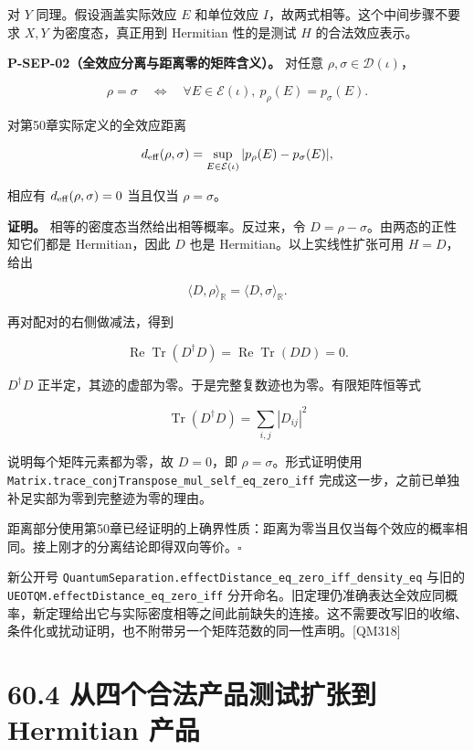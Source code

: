 \documentclass[
  11pt,
  oneside]{book}
\begin{document}
对 \(Y\) 同理。假设涵盖实际效应 \(E\) 和单位效应
\(I\)，故两式相等。这个中间步骤不要求 \(X,Y\) 为密度态，真正用到
Hermitian 性的是测试 \(H\) 的合法效应表示。

\protect\hypertarget{p-sep-02}{}{}

\textbf{P-SEP-02（全效应分离与距离零的矩阵含义）。} 对任意
\(\rho,\sigma\in\mathcal D(\iota)\)，

\[
\rho=\sigma
\quad\Longleftrightarrow\quad
\forall E\in\mathcal E(\iota),\ p_\rho(E)=p_\sigma(E).
\]

对第50章实际定义的全效应距离

\[
d_{\rm eff}(\rho,\sigma)
=\sup_{E\in\mathcal E(\iota)}
|p_\rho(E)-p_\sigma(E)|,
\]

相应有 \(d_{\rm eff}(\rho,\sigma)=0\) 当且仅当 \(\rho=\sigma\)。

\textbf{证明。} 相等的密度态当然给出相等概率。反过来，令
\(D=\rho-\sigma\)。由两态的正性知它们都是 Hermitian，因此 \(D\) 也是
Hermitian。以上实线性扩张可用 \(H=D\)，给出

\[
\langle D,\rho\rangle_{\mathbb R}
=\langle D,\sigma\rangle_{\mathbb R}.
\]

再对配对的右侧做减法，得到

\[
\operatorname{Re}\operatorname{Tr}(D^\dagger D)
=\operatorname{Re}\operatorname{Tr}(DD)=0.
\]

\(D^\dagger D\)
正半定，其迹的虚部为零。于是完整复数迹也为零。有限矩阵恒等式

\[
\operatorname{Tr}(D^\dagger D)
=\sum_{i,j}|D_{ij}|^2
\]

说明每个矩阵元素都为零，故 \(D=0\)，即 \(\rho=\sigma\)。形式证明使用
\texttt{Matrix.trace\_\allowbreak conjTranspose\_\allowbreak mul\_\allowbreak self\_\allowbreak eq\_\allowbreak zero\_\allowbreak iff}
完成这一步，之前已单独补足实部为零到完整迹为零的理由。

距离部分使用第50章已经证明的上确界性质：距离为零当且仅当每个效应的概率相同。接上刚才的分离结论即得双向等价。\(\square\)

新公开号
\texttt{QuantumSeparation.effectDistance\_\allowbreak eq\_\allowbreak zero\_\allowbreak iff\_\allowbreak density\_\allowbreak eq}
与旧的 \texttt{UEOTQM.effectDistance\_\allowbreak eq\_\allowbreak zero\_\allowbreak iff}
分开命名。旧定理仍准确表达全效应同概率，新定理给出它与实际密度相等之间此前缺失的连接。这不需要改写旧的收缩、条件化或扰动证明，也不附带另一个矩阵范数的同一性声明。{[}QM318{]}

\hypertarget{ux4eceux56dbux4e2aux5408ux6cd5ux4ea7ux54c1ux6d4bux8bd5ux6269ux5f20ux5230-hermitian-ux4ea7ux54c1}{%
\section{60.4 从四个合法产品测试扩张到 Hermitian
产品}\label{ux4eceux56dbux4e2aux5408ux6cd5ux4ea7ux54c1ux6d4bux8bd5ux6269ux5f20ux5230-hermitian-ux4ea7ux54c1}}
\end{document}
